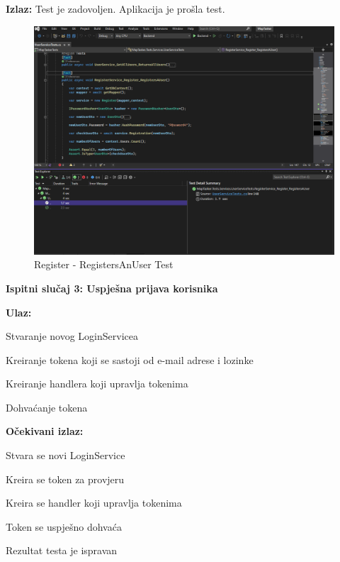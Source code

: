 			\noindent \textbf{Izlaz:} Test je zadovoljen. Aplikacija je prošla test.
			
			\begin{figure}[H] \includegraphics[width=\linewidth]{./slike/Testovi/Unit/UnitTest_2.png}
				\caption{Register - RegistersAnUser Test}
			\end{figure}
			
			\eject
		
			\noindent \textbf{Ispitni slučaj 3: Uspješna prijava korisnika}
			
			\noindent \textbf{Ulaz:}
			
			\begin{packed_enum}
				
				\item Stvaranje novog LoginServicea
				\item Kreiranje tokena koji se sastoji od e-mail adrese i lozinke
				\item Kreiranje handlera koji upravlja tokenima
				\item Dohvaćanje tokena
				
			\end{packed_enum}
			
			\noindent \textbf{Očekivani izlaz:}
			
			\begin{packed_enum}
				
				\item Stvara se novi LoginService
				\item Kreira se token za provjeru
				\item Kreira se handler koji upravlja tokenima
				\item Token se uspješno dohvaća
				\item Rezultat testa je ispravan
				
			\end{packed_enum}
			

